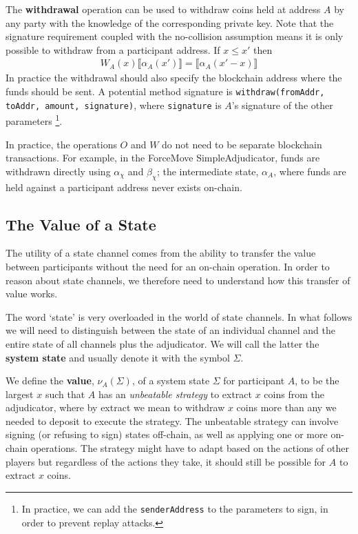 \documentclass{article}
\theoremstyle{definition}
\newcommand{\adj}[1]{\llbracket #1 \rrbracket}
\begin{document}
The \textbf{withdrawal} operation can be used to withdraw coins held at address $A$ by any
party with the knowledge of the corresponding private key. 
Note that the signature requirement coupled with the no-collision assumption means
it is only possible to withdraw from a participant address.
If $x \leq x'$ then
\begin{align*}
W_A(x) \adj{\alpha_A(x')} = \adj{\alpha_A(x'-x)}
\end{align*}
In practice the withdrawal should also specify the blockchain address where the funds should be sent.
A potential method signature is \texttt{withdraw(fromAddr, toAddr, amount, signature)}, 
where \texttt{signature} is $A$'s signature of the other parameters
\footnote{In practice, we can add the \texttt{senderAddress} to the parameters to sign,
in order to prevent replay attacks.}.

In practice, the operations $O$ and $W$ do not need to be separate blockchain transactions.
For example, in the ForceMove SimpleAdjudicator, funds are withdrawn directly using $\alpha_\chi$ and $\beta_\chi$;
the intermediate state, $\alpha_A$, where funds are held against a participant address never exists on-chain.

\subsection{The Value of a State}\label{section:value-of-a-state}

The utility of a state channel comes from the ability to transfer the value
between participants without the need for an on-chain operation.
In order to reason about state channels, we therefore need to understand how this transfer
of value works.

The word `state' is very overloaded in the world of state channels.
In what follows we will need to distinguish between the state of an individual channel and
the entire state of all channels plus the adjudicator.
We will call the latter the \textbf{system state} and usually denote it with the symbol $\Sigma$.

We define the \textbf{value}, $\nu_A(\Sigma)$, of a system state $\Sigma$ for participant $A$,
to be the largest $x$ such that $A$ has an \textit{unbeatable strategy} to extract $x$
coins from the adjudicator, where by extract we mean to withdraw $x$ coins more than any we needed to deposit to execute the strategy.
The unbeatable strategy can involve signing (or refusing to sign) states off-chain, as well as
applying one or more on-chain operations.
The strategy might have to adapt based on the actions of other players but regardless of
the actions they take, it should still be possible for $A$ to extract $x$ coins.
\end{document}
